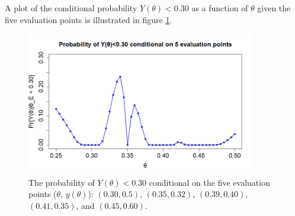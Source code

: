 A plot of the conditional probability $Y(\theta)<0.30$ as a function of $\theta$ given the five evaluation points is illustrated in figure \ref{2b}. 


\begin{figure}
    \centering
    \includegraphics[width=100mm]{2bPlot.png}
    \caption{The probability of $Y(\theta)<0.30$ conditional on the five evaluation points ($\theta$, $y(\theta)$): $(0.30,0.5)$, $(0.35,0.32)$, $(0.39,0.40)$, $(0.41,0.35)$, and $(0.45,0.60)$. }
    \label{2b}
\end{figure}